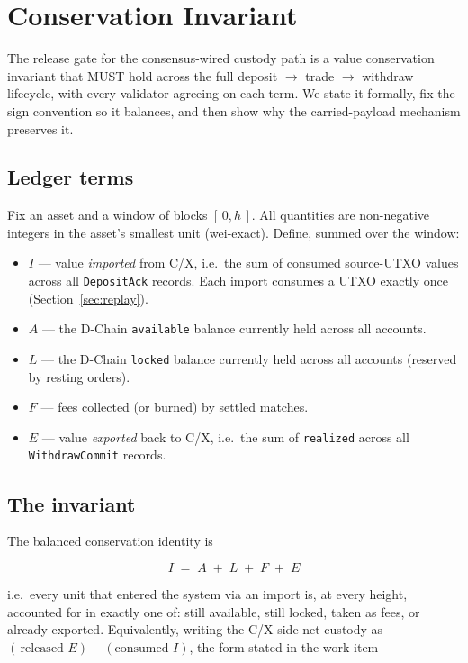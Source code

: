 \section{Conservation Invariant}
\label{sec:conservation}

The release gate for the consensus-wired custody path is a value
conservation invariant that MUST hold across the full deposit $\to$
trade $\to$ withdraw lifecycle, with every validator agreeing on each
term. We state it formally, fix the sign convention so it balances, and
then show why the carried-payload mechanism preserves it.

\subsection{Ledger terms}

Fix an asset and a window of blocks $[\,0, h\,]$. All quantities are
non-negative integers in the asset's smallest unit (wei-exact). Define,
summed over the window:

\begin{itemize}[leftmargin=2em,nosep]
\item $I$ --- value \emph{imported} from C/X, i.e.\ the sum of consumed
  source-UTXO values across all \texttt{DepositAck} records. Each import
  consumes a UTXO exactly once (Section~\ref{sec:replay}).
\item $A$ --- the D-Chain \texttt{available} balance currently held
  across all accounts.
\item $L$ --- the D-Chain \texttt{locked} balance currently held across
  all accounts (reserved by resting orders).
\item $F$ --- fees collected (or burned) by settled matches.
\item $E$ --- value \emph{exported} back to C/X, i.e.\ the sum of
  \texttt{realized} across all \texttt{WithdrawCommit} records.
\end{itemize}

\subsection{The invariant}

The balanced conservation identity is

\begin{equation}
\boxed{\;I \;=\; A \;+\; L \;+\; F \;+\; E\;}
\label{eq:cons}
\end{equation}

i.e.\ every unit that entered the system via an import is, at every
height, accounted for in exactly one of: still available, still locked,
taken as fees, or already exported. Equivalently, writing the C/X-side
net custody as $(\,\text{released } E) - (\text{consumed } I)$, the form
stated in the work item

